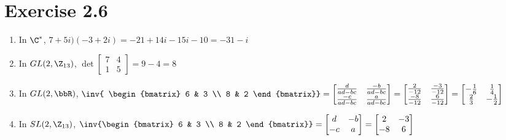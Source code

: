 \documentclass{article}
\begin{document}
\section*{Exercise 2.6}
\begin{enumerate}[label=\alph*)]
    \item In \(\C^*\), \(7+5i)(-3+2i) = -21+14i-15i-10 = -31-i\)
    \item In \(GL(2, \Z_{13})\), \(\det\begin{bmatrix}
        7 & 4 \\ 1 & 5
    \end{bmatrix}=9-4=8\)
    \item In \(GL(2, \bbR)\), \(\inv{
        \begin{bmatrix}
            6 & 3 \\ 8 & 2
        \end{bmatrix}}=\begin{bmatrix}
            \frac{d}{ad-bc} & \frac{-b}{ad-bc} \\
            \frac{-c}{ad-bc} & \frac{a}{ad-bc}
        \end{bmatrix}=\begin{bmatrix}
            \frac{2}{-12} & \frac{-3}{-12} \\
            \frac{-8}{-12} & \frac{6}{-12}
        \end{bmatrix}=\begin{bmatrix}
            -\frac{1}{6} & \frac{1}{4} \\
            \frac{2}{3} & -\frac{1}{2}
        \end{bmatrix}\)
    \item In \(SL(2, \Z_{13})\), \(\inv{\begin{bmatrix}
        6 & 3 \\ 8 & 2
    \end{bmatrix}}=\begin{bmatrix}
        d & -b \\ -c & a
    \end{bmatrix}=\begin{bmatrix}
        2 & -3 \\ -8 & 6
    \end{bmatrix}\)
\end{enumerate}
\end{document}
